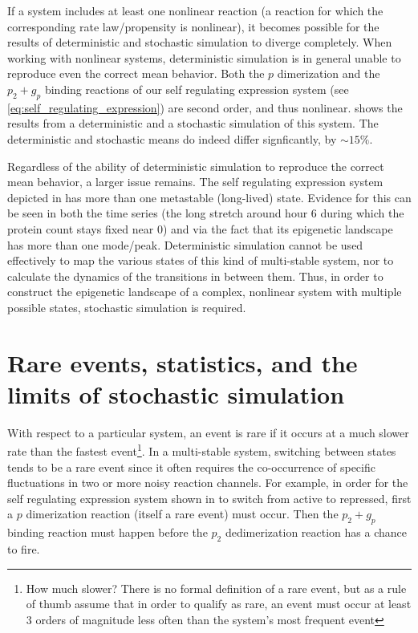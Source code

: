 If a system includes at least one nonlinear reaction (\ie a reaction for which the corresponding rate law/propensity is nonlinear), it becomes possible for the results of deterministic and stochastic simulation to diverge completely. When working with nonlinear systems, deterministic simulation is in general unable to reproduce even the correct mean behavior\cite{Hahl:2016ib}. Both the $p$ dimerization and the $p_{2} + g_{p}$ binding reactions of our self regulating expression system (see \eqref{eq:self_regulating_expression}) are second order, and thus nonlinear.  shows the results from a deterministic and a stochastic simulation of this system. The deterministic and stochastic means do indeed differ signficantly, by ${\sim} 15\%$.

Regardless of the ability of deterministic simulation to reproduce the correct mean behavior, a larger issue remains. The self regulating expression system depicted in  has more than one metastable (\ie long-lived) state. Evidence for this can be seen in both the time series (\eg the long stretch around hour 6 during which the protein count stays fixed near 0) and via the fact that its epigenetic landscape has more than one mode/peak. Deterministic simulation cannot be used effectively to map the various states of this kind of multi-stable system, nor to calculate the dynamics of the transitions in between them. Thus, in order to construct the epigenetic landscape of a complex, nonlinear system with multiple possible states, stochastic simulation is required.


\section{Rare events, statistics, and the limits of stochastic simulation}

With respect to a particular system, an event is rare\cite{Baron:2017tf} if it occurs at a much slower rate than the fastest event\footnote{How much slower? There is no formal definition of a rare event, but as a rule of thumb assume that in order to qualify as rare, an event must occur at least 3 orders of magnitude less often than the system's most frequent event}. In a multi-stable system, switching between states tends to be a rare event since it often requires the co-occurrence of specific fluctuations in two or more noisy reaction channels. For example, in order for the self regulating expression system shown in  to switch from active to repressed, first a $p$ dimerization reaction (itself a rare event) must occur. Then the $p_{2} + g_{p}$ binding reaction must happen before the $p_{2}$ dedimerization reaction has a chance to fire. 


